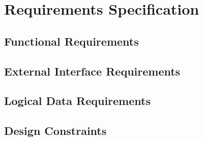 \section{Requirements Specification}
\label{sec:specification}

\subsection{Functional Requirements}
\label{sec:functional}

\subsection{External Interface Requirements}
\label{sec:external-interface}

\subsection{Logical Data Requirements}
\label{sec:logical}

\subsection{Design Constraints}
\label{sec:constraints}


